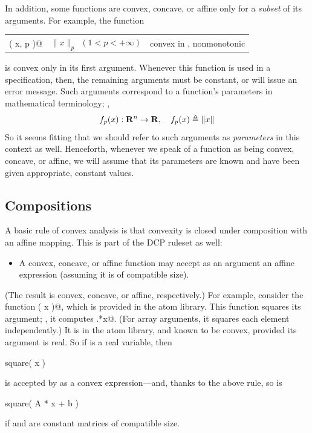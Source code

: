 \documentclass[12pt]{article}
\begin{document}
In addition, some functions are convex, concave, or affine only for 
a \emph{subset} of its arguments. For example, the function
\begin{center}
\begin{tabular}{lll}
	\verb@norm( x, p )@ & $\|x\|_p~~(1<p<+\infty)$ & convex in \verb@x@, nonmonotonic
\end{tabular}
\end{center}
is convex only in its first argument. Whenever this function is used
in a \cvx specification, then, the remaining
arguments must be constant, or \cvx will issue an error message. Such arguments
correspond to a function's parameters in mathematical terminology; \eg,
\begin{equation*}
	f_p(x):\R^n\rightarrow\R, \quad f_p(x) \triangleq \|x\|
\end{equation*}
So it seems fitting that we should refer to such arguments as \emph{parameters}
in this context as well. Henceforth, whenever we speak of a \cvx function
as being convex, concave, or affine, we will assume that its parameters are
known and have been given appropriate, constant values.

\subsection{Compositions}
\label{sec:compositions}

A basic rule of convex analysis is that convexity is closed under 
composition with an affine mapping. 
This is part of the DCP ruleset as well:
\begin{itemize}
\item A convex, concave, or affine function may accept as an argument
an affine expression (assuming it is of compatible size).
\end{itemize}
(The result is convex, concave, or affine, respectively.)
For example, consider the function \verb@square( x )@, which is provided
in the \cvx atom library. 
This function squares its argument; \ie, it computes
\verb@x.*x@. 
(For array arguments, it squares each element independently.)
It is in the \cvx atom library, and known to be convex, provided its
argument is real.  So if \verb@x@ is a real variable, then
\begin{code}
	square( x )
\end{code}
is accepted by \cvx as a convex expression---and, thanks to
the above rule, so is
\begin{code}
	square( A * x + b )
\end{code}
if \verb@A@ and \verb@b@ are constant matrices of compatible size.
\end{document}
